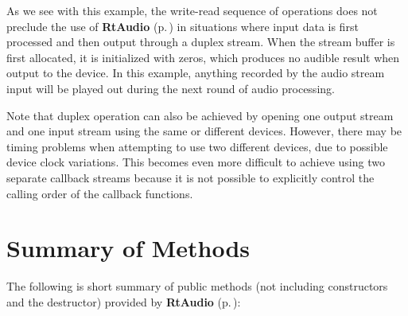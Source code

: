 As we see with this example, the write-read sequence of operations does not preclude the use of {\bf Rt\-Audio} {\rm (p.\,\pageref{classRtAudio})} in situations where input data is first processed and then output through a duplex stream. When the stream buffer is first allocated, it is initialized with zeros, which produces no audible result when output to the device. In this example, anything recorded by the audio stream input will be played out during the next round of audio processing.

Note that duplex operation can also be achieved by opening one output stream and one input stream using the same or different devices. However, there may be timing problems when attempting to use two different devices, due to possible device clock variations. This becomes even more difficult to achieve using two separate callback streams because it is not possible to explicitly control the calling order of the callback functions.

\section{Summary of Methods}\label{methods}


The following is short summary of public methods (not including constructors and the destructor) provided by {\bf Rt\-Audio} {\rm (p.\,\pageref{classRtAudio})}:

